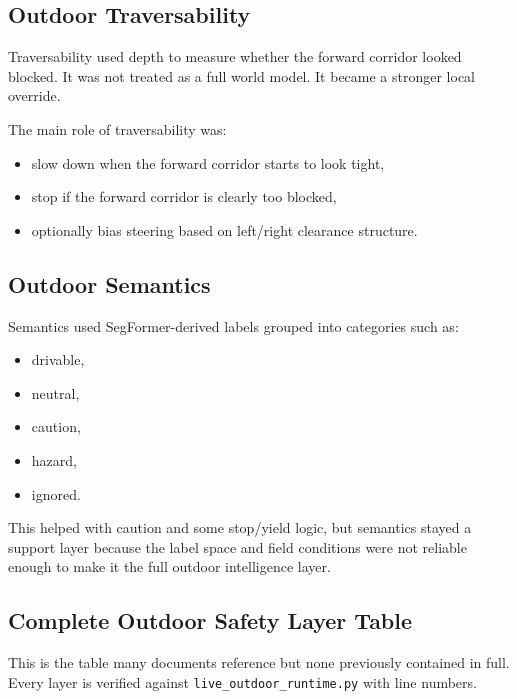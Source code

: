 \documentclass[11pt]{article}
\begin{document}
\subsection{Outdoor Traversability}

Traversability used depth to measure whether the forward corridor looked blocked. It
was not treated as a full world model. It became a stronger local override.

The main role of traversability was:

\begin{itemize}[nosep]
  \item slow down when the forward corridor starts to look tight,
  \item stop if the forward corridor is clearly too blocked,
  \item optionally bias steering based on left/right clearance structure.
\end{itemize}

\subsection{Outdoor Semantics}

Semantics used SegFormer-derived labels grouped into categories such as:

\begin{itemize}[nosep]
  \item drivable,
  \item neutral,
  \item caution,
  \item hazard,
  \item ignored.
\end{itemize}

This helped with caution and some stop/yield logic, but semantics stayed a support
layer because the label space and field conditions were not reliable enough to make
it the full outdoor intelligence layer.

\subsection{Complete Outdoor Safety Layer Table}

This is the table many documents reference but none previously contained in full.
Every layer is verified against \texttt{live\_outdoor\_runtime.py} with line numbers.
\end{document}
